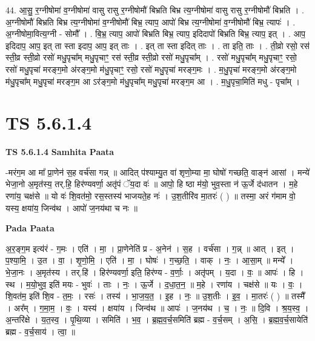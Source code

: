 \documentclass[17pt]{extarticle}
\begin{document}
44. आ॒सु॒ र॒ग्नीषोमा॑ व॒ग्नीषोमा॑ वासु रासु र॒ग्नीषोमौ॑ बिभ्रति बिभ्र त्य॒ग्नीषोमा॑ वासु रासु र॒ग्नीषोमौ॑ बिभ्रति । . अ॒ग्नीषोमौ॑ बिभ्रति बिभ्र त्य॒ग्नीषोमा॑ व॒ग्नीषोमौ॑ बिभ्र॒ त्याप॒ आपो॑ बिभ्र त्य॒ग्नीषोमा॑ व॒ग्नीषोमौ॑ बिभ्र॒ त्यापः॑ । . अ॒ग्नीषोमा॒वित्य॒ग्नी - सोमौ᳚ । . बि॒भ्र॒ त्याप॒ आपो॑ बिभ्रति बिभ्र॒ त्याप॒ इदिदापो॑ बिभ्रति बिभ्र॒ त्याप॒ इत् । . आप॒ इदिदाप॒ आप॒ इत् ता स्ता इदाप॒ आप॒ इत् ताः । . इत् ता स्ता इदित् ताः । . ता इति॒ ताः । . ती॒व्रो रसो॒ रस॑ स्ती॒व्र स्ती॒व्रो रसो॑ मधु॒पृचा᳚म् मधु॒पृचाꣳ॒॒ रस॑ स्ती॒व्र स्ती॒व्रो रसो॑ मधु॒पृचा᳚म् । . रसो॑ मधु॒पृचा᳚म् मधु॒पृचाꣳ॒॒ रसो॒ रसो॑ मधु॒पृचा॑ मरङ्ग॒मो अ॑रङ्ग॒मो म॑धु॒पृचाꣳ॒॒ रसो॒ रसो॑ मधु॒पृचा॑ मरङ्ग॒मः । . म॒धु॒पृचा॑ मरङ्ग॒मो अ॑रङ्ग॒मो म॑धु॒पृचा᳚म् मधु॒पृचा॑ मरङ्ग॒म आ ऽर॑ङ्ग॒मो म॑धु॒पृचा᳚म् मधु॒पृचा॑ मरङ्ग॒म आ । . म॒धु॒पृचा॒मिति॑ मधु - पृचा᳚म् । \newline
\pagebreak
{}

\section{ TS 5.6.1.4 }

\textbf{TS 5.6.1.4 } \newline
\textbf{Samhita Paata} \newline

-मरंग॒म आ मा᳚ प्रा॒णेन॑ स॒ह वर्च॑सा गन्न् ॥ आदित् प॑श्याम्यु॒त वा॑ शृणो॒म्या मा॒ घोषो॑ गच्छति॒ वाङ्न॑ आसां । मन्ये॑ भेजा॒नो अ॒मृत॑स्य॒ तर्.हि॒ हिर॑ण्यवर्णा॒ अतृ॑पं ॅय॒दा वः॑ ॥ आपो॒ हि ष्ठा म॑यो॒ भुव॒स्ता न॑ ऊ॒र्जे द॑धातन । म॒हे रणा॑य॒ चक्ष॑से ॥ यो वः॑ शि॒वत॑मो॒ रस॒स्तस्य॑ भाजयते॒ह नः॑ । उ॒श॒तीरि॑व मा॒तरः॑ ( ) ॥ तस्मा॒ अरं ग॑माम वो॒ यस्य॒ क्षया॑य॒ जिन्व॑थ । आपो॑ ज॒नय॑था च नः ॥ \newline

\textbf{Pada Paata} \newline

अ॒र॒ङ्ग॒म इत्य॑रं - ग॒मः । एति॑ । मा॒ । प्रा॒णेनेति॑ प्र - अ॒नेन॑ । स॒ह । वर्च॑सा । ग॒न्न् ॥ आत् । इत् । प॒श्या॒मि॒ । उ॒त । वा॒ । शृ॒णो॒मि॒ । एति॑ । मा॒ । घोषः॑ । ग॒च्छ॒ति॒ । वाक् । नः॒ । आ॒सा॒म् ॥ मन्ये᳚ । भे॒जा॒नः । अ॒मृत॑स्य । तर्.हि॑ । हिर॑ण्यवर्णा॒ इति॒ हिर॑ण्य - व॒र्णाः॒ । अतृ॑पम् । य॒दा । वः॒ ॥ आपः॑ । हि । स्थ । म॒यो॒भुव॒ इति॑ मयः - भुवः॑ । ताः । नः॒ । ऊ॒र्जे । द॒धा॒त॒न॒ ॥ म॒हे । रणा॑य । चक्ष॑से ॥ यः । वः॒ । शि॒वत॑म॒ इति॑ शि॒व - त॒मः॒ । रसः॑ । तस्य॑ । भा॒ज॒य॒त॒ । इ॒ह । नः॒ ॥ उ॒श॒तीः । इ॒व॒ । मा॒तरः॑ ( ) ॥ तस्मै᳚ । अर᳚म् । ग॒मा॒म॒ । वः॒ । यस्य॑ । क्षया॑य । जिन्व॑थ ॥ आपः॑ । ज॒नय॑थ । च॒ । नः॒ ॥ दि॒वि । श्र॒य॒स्व॒ । अ॒न्तरि॑क्षे । य॒त॒स्व॒ । पृ॒थि॒व्या । समिति॑ । भ॒व॒ । ब्र॒ह्म॒व॒र्च॒समिति॑ ब्रह्म - व॒र्च॒सम् । अ॒सि॒ । ब्र॒ह्म॒व॒र्च॒सायेति॑ ब्रह्म - व॒र्च॒साय॑ । त्वा॒ ॥  \newline
\end{document}
